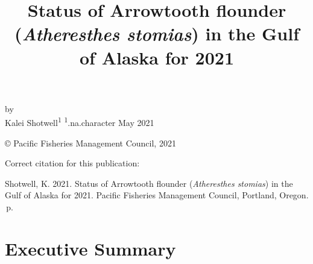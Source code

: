 \documentclass[11pt,
  english,
  a4paper,
]{article}
\date{}
\newcommand{\trTitle}{Status of Arrowtooth flounder (\emph{Atheresthes stomias}) in the Gulf of Alaska for 2021}
\newcommand{\trYear}{2021}
\newcommand{\trMonth}{May}
\newcommand{\trAuthsBack}{Shotwell, K}
\newcommand{\trCitation}{
\begin{hangparas}{1em}{1}
\trAuthsBack{}. \trYear{}. \trTitle{}. Pacific Fisheries Management Council, Portland, Oregon. \pageref{LastPage}{}\,p.
\end{hangparas}}
\begin{document}

\renewcommand*{\thefootnote}{\fnsymbol{footnote}}

\small
\thispagestyle{empty}
\noindent
\begin{center}
\title{Status of Arrowtooth flounder (\emph{Atheresthes stomias}) in the Gulf of Alaska for 2021}
\vspace{1.5cm}
{\Large\textbf{}}
\vfill
by\\
Kalei Shotwell\textsuperscript{1}\vfill
\textsuperscript{1}.na.character\vfill
\trMonth{} \trYear{}
\end{center}
\clearpage

\thispagestyle{empty}
\vspace*{\fill}
\begin{center}
\copyright{} Pacific Fisheries Management Council, \trYear{}\\
\end{center}
\par
\bigskip
\noindent
Correct citation for this publication:
\bigskip
\par
\trCitation{}
\clearpage


\tableofcontents\clearpage
\listoffigures \listoftables \clearpage
\label{TRlastRoman}
\clearpage

\newpage
\thispagestyle{empty} %

\pagestyle{plain}  %
\renewcommand*{\thefootnote}{\arabic{footnote}}  %
\setcounter{footnote}{0}  %
\renewcommand{\headrulewidth}{0.5pt}
\renewcommand{\footrulewidth}{0.5pt}

\newcommand{\lt}{\ensuremath <}
\newcommand{\gt}{\ensuremath >}


\hypertarget{executive-summary}{%
\section*{Executive Summary}\label{executive-summary}}
\end{document}
